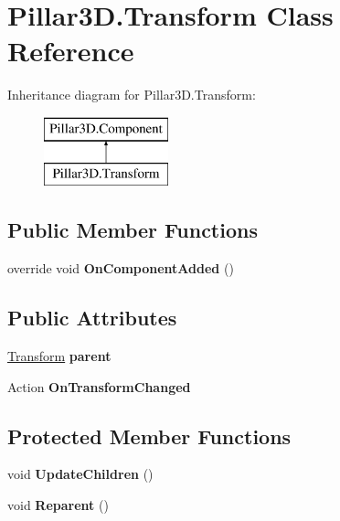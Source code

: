 \hypertarget{class_pillar3_d_1_1_transform}{}\section{Pillar3\+D.\+Transform Class Reference}
\label{class_pillar3_d_1_1_transform}
Inheritance diagram for Pillar3\+D.\+Transform\+:\begin{figure}[H]
\begin{center}
\leavevmode
\includegraphics[height=2.000000cm]{class_pillar3_d_1_1_transform}
\end{center}
\end{figure}
\subsection*{Public Member Functions}
\begin{DoxyCompactItemize}
\item 
\mbox{\label{class_pillar3_d_1_1_transform_a0b6d30af9034cefa3a508fbc07ec1575}} 
override void {\bfseries On\+Component\+Added} ()
\end{DoxyCompactItemize}
\subsection*{Public Attributes}
\begin{DoxyCompactItemize}
\item 
\mbox{\label{class_pillar3_d_1_1_transform_a9c8f61e79731d3e0c003232529e1e338}} 
\hyperlink{class_pillar3_d_1_1_transform}{Transform} {\bfseries parent}
\item 
\mbox{\label{class_pillar3_d_1_1_transform_a3d3c7ba18825079d5105ea0445f25faa}} 
Action {\bfseries On\+Transform\+Changed}
\end{DoxyCompactItemize}
\subsection*{Protected Member Functions}
\begin{DoxyCompactItemize}
\item 
\mbox{\label{class_pillar3_d_1_1_transform_aa7977f9a5f9270f5c89a7edd97d20042}} 
void {\bfseries Update\+Children} ()
\item 
\mbox{\label{class_pillar3_d_1_1_transform_a30f95c9bbc9e0431bbfe51dfe72b5f46}} 
void {\bfseries Reparent} ()
\end{DoxyCompactItemize}
